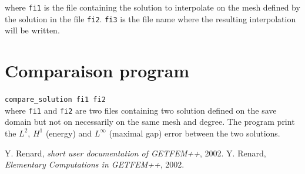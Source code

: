 \documentclass[11pt,a4paper]{article}
\begin{document}
where {\tt fi1} is the file containing the solution to interpolate on the mesh defined by the solution in the file {\tt fi2}. {\tt fi3} is the file name where the resulting interpolation will be written. 

\section{Comparaison program}

{\tt compare\_solution fi1 fi2} \\[0.5cm]

where {\tt fi1} and {\tt fi2} are two files containing two solution defined on the save domain but not on necessarily on the same mesh and degree. The program print the $L^2$, $H^1$ (energy) and $L^{\infty}$ (maximal gap) error between the two solutions. 

\begin{thebibliography}{99}
% 
% 
% 
  Y. {\sc Renard},
  {\it short user documentation of GETFEM++}, 2002.
  Y. {\sc Renard},
  {\it Elementary Computations in GETFEM++}, 2002.
\end{thebibliography}
\end{document}

